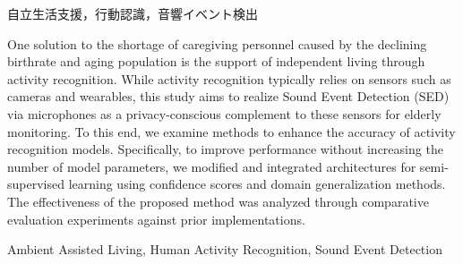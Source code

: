 \documentclass[technicalreport]{classes/ieicej}
\begin{document}
\renewcommand{\baselinestretch}{0.65}


\begin{keyword}
自立生活支援，行動認識，音響イベント検出
\end{keyword}
\begin{eabstract}
One solution to the shortage of caregiving personnel caused by the declining birthrate and aging population is the support of independent living through activity recognition. 
While activity recognition typically relies on sensors such as cameras and wearables, this study aims to realize Sound Event Detection (SED) via microphones as a privacy-conscious complement to these sensors for elderly monitoring. 
To this end, we examine methods to enhance the accuracy of activity recognition models. 
Specifically, to improve performance without increasing the number of model parameters, we modified and integrated architectures for semi-supervised learning using confidence scores and domain generalization methods. 
The effectiveness of the proposed method was analyzed through comparative evaluation experiments against prior implementations.

\end{eabstract}
\begin{ekeyword}
Ambient Assisted Living, Human Activity Recognition, Sound Event Detection
\end{ekeyword}
\maketitle












\end{document}
